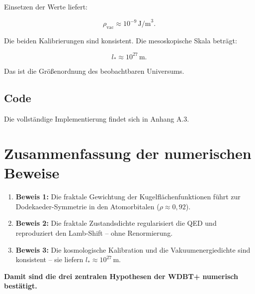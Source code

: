 Einsetzen der Werte liefert:

\begin{equation}
\rho_{\text{vac}} \approx 10^{-9} \, \text{J/m}^3. \tag{9.4}
\end{equation}

Die beiden Kalibrierungen sind konsistent. Die mesoskopische Skala beträgt:

\begin{equation}
l_* \approx 10^{27} \, \text{m}. \tag{9.5}
\end{equation}

Das ist die Größenordnung des beobachtbaren Universums.

\subsection{Code}

Die vollständige Implementierung findet sich in Anhang A.3.

\section{Zusammenfassung der numerischen Beweise}

\begin{enumerate}
    \item \textbf{Beweis 1:} Die fraktale Gewichtung der Kugelflächenfunktionen führt zur Dodekaeder-Symmetrie in den Atomorbitalen (\( \rho \approx 0,92 \)).
    \item \textbf{Beweis 2:} Die fraktale Zustandsdichte regularisiert die QED und reproduziert den Lamb-Shift – ohne Renormierung.
    \item \textbf{Beweis 3:} Die kosmologische Kalibration und die Vakuumenergiedichte sind konsistent – sie liefern \( l_* \approx 10^{27} \, \text{m} \).
\end{enumerate}

\textbf{Damit sind die drei zentralen Hypothesen der WDBT+ numerisch bestätigt.}
